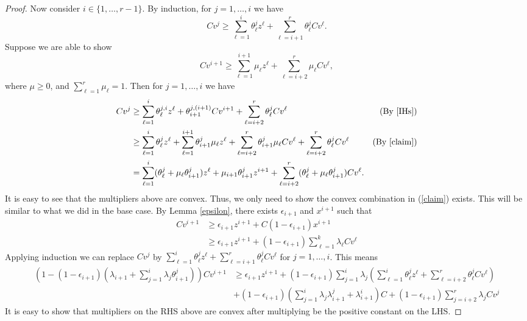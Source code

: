 \begin{proof}
	Now consider $i\in \{1,\ldots,r-1\}$. By induction, for $j=1,\ldots,i$ we have
	\begin{equation}\label{IHs}
	Cv^j \geq  \sum_{\ell=1}^{i} \theta^{j}_\ell z^\ell + \sum_{\ell=i+1}^{r}\theta^{j}_{\ell}Cv^\ell.
	\end{equation}
	Suppose we are able to show 
	 \begin{equation}\label{claim} 
	 Cv^{i+1} \geq \sum_{\ell=1}^{i+1} \mu_\ell z^\ell + \sum_{\ell=i+2}^{r}\mu_{\ell}Cv^\ell,\end{equation} 
	where $\mu\geq 0$, and $\sum_{\ell=1}^{r}\mu_{\ell}=1$. Then for $j=1,\ldots,i$ we have
	\begin{align*}
	Cv^j& \geq \sum_{\ell=1}^{i} \theta^{j,i}_\ell z^\ell +\theta^{j,(i+1)}_{i+1}Cv^{i+1}+  \sum_{\ell=i+2}^{r}\theta^{j}_{\ell}Cv^\ell & (\mbox{By } \ref{IHs})\\
		& \geq \sum_{\ell=1}^{i} \theta^{j}_\ell z^\ell +\sum_{\ell=1}^{i+1}\theta^{j}_{i+1}\mu_\ell z^\ell+ \sum_{\ell=i+2}^{r}\theta^j_{i+1}\mu_{\ell}Cv^\ell +   \sum_{\ell=i+2}^{r}\theta^{j}_{\ell}Cv^\ell& (\mbox{By } \ref{claim})\\
		&= \sum_{\ell=1}^{i} (\theta^j_\ell+\mu_{\ell}\theta^j_{i+1}) z^\ell + \mu_{i+1}\theta^j_{i+1}z^{i+1} + \sum_{\ell=i+2}^{r} (\theta^j_\ell+\mu_\ell\theta^j_{i+1})Cv^\ell.&
 			\end{align*} 
		It is easy to see that the multipliers above are convex. Thus, we only need to show the convex combination in (\ref{claim}) exists. This will be similar to what we did in the base case. By Lemma \ref{epsilon}, there exists $\epsilon_{i+1}$ and $x^{i+1}$ such that
		\begin{align*}
		Cv^{i+1}&\geq \epsilon_{i+1}z^{i+1}+ C(1-\epsilon_{i+1})x^{i+1}\\
		&\geq \epsilon_{i+1}z^{i+1}+ (1-\epsilon_{i+1})\sum_{\ell=1}^{k}\lambda_{\ell}Cv^\ell
			\end{align*}
			Applying induction we can replace $Cv^j$ by $ \sum_{\ell=1}^{i} \theta^{j}_\ell z^\ell + \sum_{\ell=i+1}^{r}\theta^{j}_{\ell}Cv^\ell$ for $j=1,\ldots,i$. 
			This means
			\begin{align*}
			(1-(1-\epsilon_{i+1})(\lambda_{i+1}+\sum_{j=1}^{i}\lambda_j\theta^j_{i+1}))Cv^{i+1}&\geq \epsilon_{i+1}z^{i+1}+(1-\epsilon_{i+1})\sum_{j=1}^{i}\lambda_j (\sum_{\ell=1}^{i}\theta^j_\ell z^\ell+ \sum_{\ell=i+2}^{r}\theta^j_\ell Cv^\ell)\\
			&+(1-\epsilon_{i+1})(\sum_{j=1}^{i}\lambda_j \lambda^j_{i+1}+\lambda^i_{i+1})C+ (1-\epsilon_{i+1})\sum_{j=i+2}^{r}\lambda_jCv^{j} 
			\end{align*}
			It is easy to show that  multipliers on the RHS above are convex after multiplying be the positive constant on the LHS.	
\end{proof}

